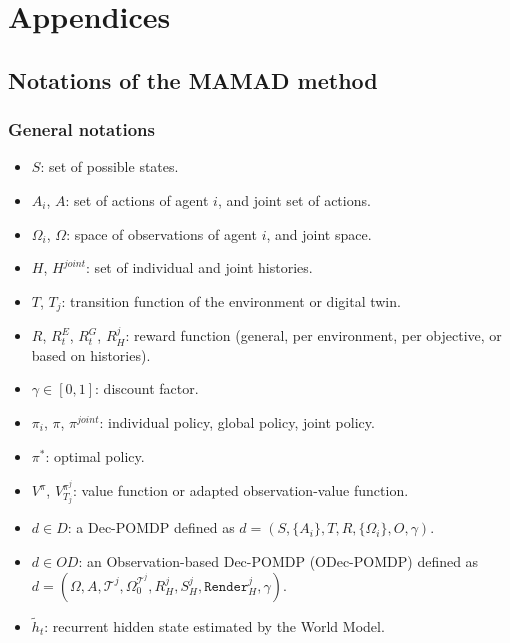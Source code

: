 \clearpage
\thispagestyle{empty}
\null
\newpage
\cleardoublepage
{}
{}
\part*{Appendices}
\label{part:annexes}
\clearpage
\thispagestyle {empty}
\null
\newpage
\chapter{Notations of the MAMAD method}\label{appendix:notations}
\section{General notations}
\begin{itemize}
       \item $S$: set of possible states.
       \item $A_i$, $A$: set of actions of agent $i$, and joint set of actions.

       \item $\Omega_i$, $\Omega$: space of observations of agent $i$, and joint space.
       \item $H$, $H^{joint}$: set of individual and joint histories.
       \item $T$, $T_j$: transition function of the environment or digital twin.

       \item $R$, $R^E_t$, $R^G_t$, $R^j_H$: reward function (general, per environment, per objective, or based on histories).
       \item $\gamma \in [0,1]$: discount factor.

       \item $\pi_i$, $\pi$, $\pi^{joint}$: individual policy, global policy, joint policy.
       \item $\pi^*$: optimal policy.

       \item $V^\pi$, $V^{\pi^j}_{T_j}$: value function or adapted observation-value function.
       \item $d \in D$: a Dec-POMDP defined as $d = (S,\{A_i\},T,R,\{\Omega_i\},O,\gamma)$.
       \item $d \in OD$: an Observation-based Dec-POMDP (ODec-POMDP) defined as $d = (\Omega, A, \mathcal{T}^j, \Omega^{\mathcal{T}^j}_0, R^j_H, S^j_H, \texttt{Render}^j_H, \gamma)$.

       \item $\tilde{h}_t$: recurrent hidden state estimated by the World Model.
\end{itemize}
